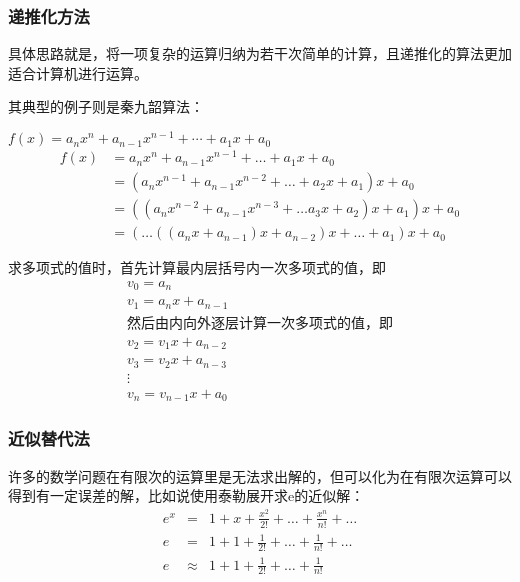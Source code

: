 \documentclass[12pt]{report}
\numberwithin{equation}{section}
\begin{document}
	\subsubsection{递推化方法}
	具体思路就是，将一项复杂的运算归纳为若干次简单的计算，且递推化的算法更加适合计算机进行运算。
	
	其典型的例子则是秦九韶算法：

	$f(x)=a_{n} x^{n}+a_{n-1} x^{n-1}+\cdots+a_{1} x+a_{0}$ 
	\begin{equation}
		\begin{aligned}
			f(x)&=a_{n} x^{n}+a_{n-1} x^{n-1}+\ldots+a_{1} x+a_{0} \\
				&=\left(a_{n} x^{n-1}+a_{n-1} x^{n-2}+\ldots+a_{2} x+a_{1}\right) x+a_{0} \\
				&=\left(\left(a_{n} x^{n-2}+a_{n-1} x^{n-3}+\ldots a_{3} x+a_{2}\right) x+a_{1}\right) x+a_{0} \\
				&=\left(\ldots\left(\left(a_{n} x+a_{n-1}\right) x+a_{n-2}\right) x+\ldots+a_{1}\right) x+a_{0}
		\end{aligned}
	\end{equation}

	求多项式的值时，首先计算最内层括号内一次多项式的值，即
	$$
	\begin{array}{l}
		v_{0}=a_{n} \\
		v_{1}=a_{n} x+a_{n-1} \\
		\text{然后由内向外逐层计算一次多项式的值，即} \\
		v_{2}=v_{1} x+a_{n-2} \\
		v_{3}=v_{2} x+a_{n-3} \\
		\vdots	\\
		v_{n}=v_{n-1} x+a_{0}
	\end{array}
	$$

	
	\subsubsection{近似替代法}
	许多的数学问题在有限次的运算里是无法求出解的，但可以化为在有限次运算可以得到有一定误差的解，比如说使用泰勒展开求e的近似解：  
	\begin{equation}
		\begin{aligned}
			e^x &=& 1 + x + \frac{x^2}{2!} + \ldots + \frac{x^n}{n!} + \ldots \\
			e &=& 1 + 1 + \frac{1}{2!} + \ldots + \frac{1}{n!} + \ldots \\
			e &\approx& 1 + 1 + \frac{1}{2!} + \ldots + \frac{1}{n!}
		\end{aligned}
	\end{equation}
\end{document}
